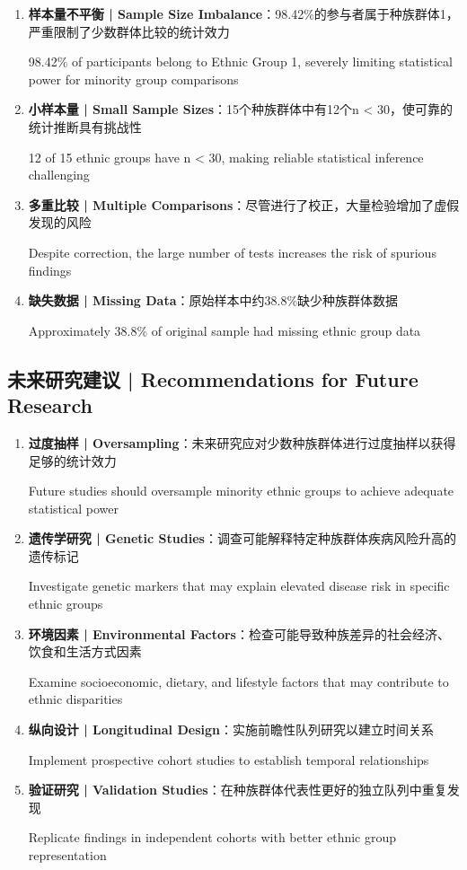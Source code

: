 \documentclass[12pt,a4paper]{article}
\begin{document}
\begin{enumerate}
    \item \textbf{样本量不平衡 | Sample Size Imbalance}：98.42\%的参与者属于种族群体1，严重限制了少数群体比较的统计效力
    
    98.42\% of participants belong to Ethnic Group 1, severely limiting statistical power for minority group comparisons
    
    \item \textbf{小样本量 | Small Sample Sizes}：15个种族群体中有12个n < 30，使可靠的统计推断具有挑战性
    
    12 of 15 ethnic groups have n < 30, making reliable statistical inference challenging
    
    \item \textbf{多重比较 | Multiple Comparisons}：尽管进行了校正，大量检验增加了虚假发现的风险
    
    Despite correction, the large number of tests increases the risk of spurious findings
    
    \item \textbf{缺失数据 | Missing Data}：原始样本中约38.8\%缺少种族群体数据
    
    Approximately 38.8\% of original sample had missing ethnic group data
\end{enumerate}

\subsection{未来研究建议 | Recommendations for Future Research}

\begin{enumerate}
    \item \textbf{过度抽样 | Oversampling}：未来研究应对少数种族群体进行过度抽样以获得足够的统计效力
    
    Future studies should oversample minority ethnic groups to achieve adequate statistical power
    
    \item \textbf{遗传学研究 | Genetic Studies}：调查可能解释特定种族群体疾病风险升高的遗传标记
    
    Investigate genetic markers that may explain elevated disease risk in specific ethnic groups
    
    \item \textbf{环境因素 | Environmental Factors}：检查可能导致种族差异的社会经济、饮食和生活方式因素
    
    Examine socioeconomic, dietary, and lifestyle factors that may contribute to ethnic disparities
    
    \item \textbf{纵向设计 | Longitudinal Design}：实施前瞻性队列研究以建立时间关系
    
    Implement prospective cohort studies to establish temporal relationships
    
    \item \textbf{验证研究 | Validation Studies}：在种族群体代表性更好的独立队列中重复发现
    
    Replicate findings in independent cohorts with better ethnic group representation
\end{enumerate}
\end{document}
